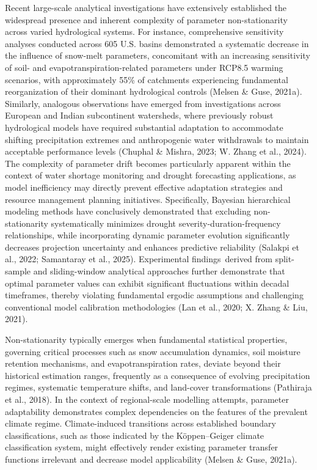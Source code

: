 \documentclass[
]{article}
\begin{document}
Recent large-scale analytical investigations have extensively
established the widespread presence and inherent complexity of parameter
non-stationarity across varied hydrological systems. For instance,
comprehensive sensitivity analyses conducted across 605 U.S. basins
demonstrated a systematic decrease in the influence of snow-melt
parameters, concomitant with an increasing sensitivity of soil- and
evapotranspiration-related parameters under RCP8.5 warming scenarios,
with approximately 55\% of catchments experiencing fundamental
reorganization of their dominant hydrological controls (Melsen \& Guse,
2021a). Similarly, analogous observations have emerged from
investigations across European and Indian subcontinent watersheds, where
previously robust hydrological models have required substantial
adaptation to accommodate shifting precipitation extremes and
anthropogenic water withdrawals to maintain acceptable performance
levels (Chuphal \& Mishra, 2023; W. Zhang et al., 2024). The complexity
of parameter drift becomes particularly apparent within the context of
water shortage monitoring and drought forecasting applications, as model
inefficiency may directly prevent effective adaptation strategies and
resource management planning initiatives. Specifically, Bayesian
hierarchical modeling methods have conclusively demonstrated that
excluding non-stationarity systematically minimizes drought
severity-duration-frequency relationships, while incorporating dynamic
parameter evolution significantly decreases projection uncertainty and
enhances predictive reliability (Salakpi et al., 2022; Samantaray et
al., 2025). Experimental findings~derived from split-sample and
sliding-window analytical approaches further demonstrate that optimal
parameter values can exhibit significant fluctuations within decadal
timeframes, thereby violating fundamental ergodic assumptions and
challenging conventional model calibration methodologies (Lan et al.,
2020; X. Zhang \& Liu, 2021).

Non-stationarity typically emerges when fundamental statistical
properties, governing critical processes such as snow accumulation
dynamics, soil moisture retention mechanisms, and evapotranspiration
rates, deviate beyond their historical estimation ranges, frequently as
a consequence of evolving precipitation regimes, systematic temperature
shifts, and land-cover transformations (Pathiraja et al., 2018). In the
context of regional-scale modelling attempts, parameter adaptability
demonstrates complex dependencies on the features of the prevalent
climate regime. Climate-induced transitions across established boundary
classifications, such as those indicated by the Köppen--Geiger climate
classification system, might effectively render existing parameter
transfer functions irrelevant and decrease model applicability (Melsen
\& Guse, 2021a).
\end{document}
